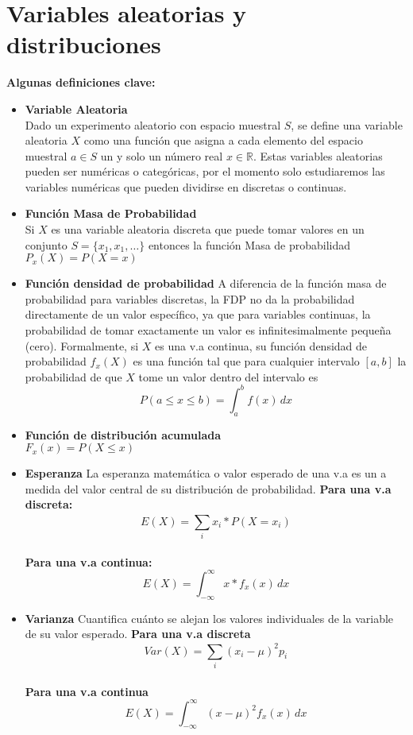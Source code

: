 \documentclass{report}
\begin{document}
\section{Variables aleatorias y distribuciones}
\textbf{Algunas definiciones clave:}\\
\begin{itemize}
    \item \textbf{Variable Aleatoria}\\
    Dado un experimento aleatorio con espacio muestral \(S\), se define una variable aleatoria \(X\) como una función que asigna a cada elemento del espacio muestral \(a \in S\) un y solo un número real \(x \in \mathbb{R} \). 
    Estas variables aleatorias pueden ser numéricas o categóricas, por el momento solo estudiaremos las variables numéricas que pueden dividirse en discretas o continuas. 
    \item\textbf{Función Masa de Probabilidad}\\
    Si \(X\) es una variable aleatoria discreta que puede tomar valores en un conjunto \(S = \{x_1, x_1, \dots \}\) entonces la función Masa de probabilidad \(P_x(X) = P(X=x)\)
    \item \textbf{Función densidad de probabilidad}
    A diferencia de la función masa de probabilidad para variables discretas, la FDP no da la probabilidad directamente de un valor específico, ya que para variables continuas, la probabilidad de tomar exactamente un valor es infinitesimalmente pequeña (cero).
    Formalmente, si \(X\) es una v.a continua, su función densidad de probabilidad \(f_x(X)\) es una función tal que para cualquier intervalo \( [a, b]\) la probabilidad de que \(X\) tome un valor dentro del intervalo es 
    \[P(a\leq x \leq b) = \int_{a}^{b} f(x)\, dx \]
    \item\textbf{Función de distribución acumulada}\\
    \(F_x(x) = P(X \leq x) \)
    \item \textbf{Esperanza} La esperanza matemática o valor esperado de una v.a es un a medida del valor central de su distribución de probabilidad. 
    \textbf{Para  una v.a discreta:}
    \[E(X) = \sum_{i}^{} x_i * P(X=x_i) \]\\
    \textbf{Para una v.a continua:}
    \[E(X) = \int_{-\infty}^{\infty} x*f_x(x)\, dx\]
    
    \item\textbf{Varianza} Cuantifica cuánto se alejan los valores individuales de la variable de su valor esperado. 
    \textbf{Para una v.a discreta}
    \[Var(X) = \sum_{i}^{} (x_i - \mu)^2p_i\]\\
    \textbf{Para una v.a continua}
    \[E(X) = \int_{-\infty}^{\infty} (x- \mu)^2 f_x(x)\, dx\]
\end{itemize}
\newpage
\end{document}
